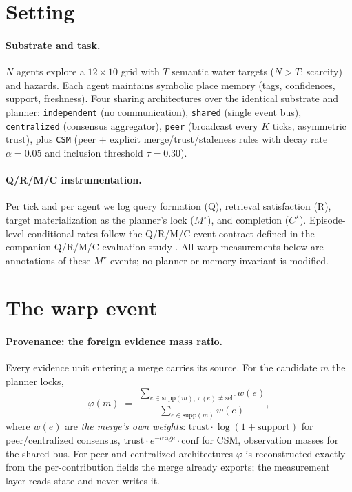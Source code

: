 \documentclass{article}
\newcommand{\method}[1]{\texttt{#1}}
\newcommand{\mstar}{M^{\star}}
\newcommand{\cstar}{C^{\star}}
\begin{document}
\section{Setting}
\label{p2:sec:setting}

\paragraph{Substrate and task.} $N$ agents explore a $12\times10$ grid
with $T$ semantic water targets ($N>T$: scarcity) and hazards. Each
agent maintains symbolic place memory (tags, confidences, support,
freshness). Four sharing architectures over the identical substrate
and planner: \method{independent} (no communication),
\method{shared} (single event bus), \method{centralized} (consensus
aggregator), \method{peer} (broadcast every $K$ ticks, asymmetric
trust), plus \method{CSM} (peer $+$ explicit merge/trust/staleness
rules with decay rate $\alpha{=}0.05$ and inclusion threshold
$\tau{=}0.30$).

\paragraph{Q/R/M/C instrumentation.} Per tick and per agent we log
query formation (Q), retrieval satisfaction (R), target
materialization as the planner's lock ($\mstar$), and completion
($\cstar$). Episode-level conditional rates follow the Q/R/M/C event contract defined in the companion Q/R/M/C evaluation study \citep{songlines1}. All warp measurements below are annotations of these
$\mstar$ events; no planner or memory invariant is modified.


\section{The warp event}
\label{p2:sec:warp-def}

\paragraph{Provenance: the foreign evidence mass ratio.} Every
evidence unit entering a merge carries its source. For the candidate
$m$ the planner locks,
\[
\varphi(m) \;=\;
\frac{\sum_{e\in\mathrm{supp}(m),\,\pi(e)\neq\mathrm{self}} w(e)}
     {\sum_{e\in\mathrm{supp}(m)} w(e)},
\]
where $w(e)$ are \emph{the merge's own weights}: $\text{trust}\cdot
\log(1{+}\text{support})$ for peer/centralized consensus,
$\text{trust}\cdot e^{-\alpha\,\text{age}}\cdot\text{conf}$ for CSM,
observation masses for the shared bus. For peer and centralized
architectures $\varphi$ is reconstructed exactly from the
per-contribution fields the merge already exports; the measurement
layer reads state and never writes it.
\end{document}
